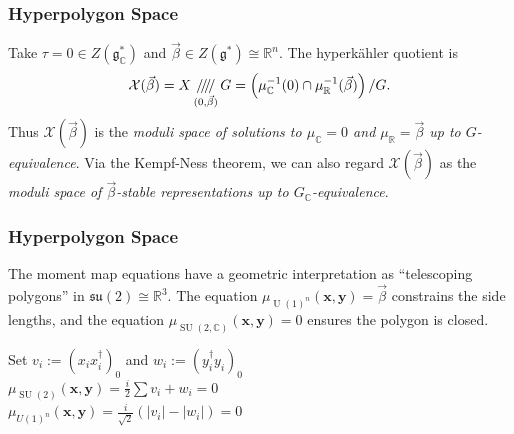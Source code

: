 \documentclass[aspectratio=1610,10pt]{beamer}
\theoremstyle{definition}
\theoremstyle{named}
\newcommand{\R}{\mathbb{R}}
\newcommand{\C}{\mathbb{C}}
\DeclareMathOperator{\U}{U}
\DeclareMathOperator{\SU}{SU}
\DeclareMathOperator{\Hom}{Hom}
\DeclareMathOperator{\Rep}{Rep}
\DeclareMathOperator*{\twoslash}{\hspace{-.2em}/\hspace{-.2em}/\hspace{-.2em}}
\DeclareMathOperator*{\fourslash}{\twoslash\twoslash}
\newcommand{\bx}{\mathbf{x}}
\newcommand{\by}{\mathbf{y}}
\begin{document}
\begin{frame}
    \frametitle{Hyperpolygon Space}
    Take $\tau=0\in Z(\mathfrak g_\C^*)$ and $\vec\beta\in Z(\mathfrak g^*)\cong\R^n$.  The hyperkähler quotient is
        $$\mathcal X(\vec\beta)=X\fourslash\limits_{(0,\vec\beta)}G=\left(\mu_\C^{-1}(0)\cap\mu_\R^{-1}(\vec\beta)\right)/G.$$
    Thus $\mathcal X(\vec\beta)$ is the \emph{moduli space of solutions to $\mu_\C=0$ and $\mu_\R=\vec\beta$ up to $G$-equivalence}.
    \vfill
    \pause
    Via the Kempf-Ness theorem, we can also regard $\mathcal X(\vec\beta)$ as the \emph{moduli space of $\vec\beta$-stable representations up to $G_\C$-equivalence}.
\end{frame}

\begin{frame}
    \frametitle{Hyperpolygon Space}
    The moment map equations have a geometric interpretation as ``telescoping polygons'' in $\mathfrak{su}(2)\cong\R^3$.  The equation $\mu_{\U(1)^n}(\bx,\by)=\vec\beta$ constrains the side lengths, and the equation $\mu_{\SU(2,\C)}(\bx,\by)=0$ ensures the polygon is closed.
    \vfill
    \begin{minipage}[t]{0.45\textwidth}
        \vspace{25pt}
        Set $v_i:=(x_ix_i^\dagger)_0$ and $w_i:=(y_i^\dagger y_i)_0$\\[1cm]
        $\mu_{\SU(2)}(\bx,\by)=\frac i2\sum v_i+w_i=0$\\[2pt]
        $\mu_{U(1)^n}(\bx,\by)=\frac i{\sqrt2}\left(|v_i|-|w_i|\right)=0$
        \vfill
    \end{minipage}
    \hfill
    \begin{minipage}[t]{0.45\textwidth}
        \vspace{-15pt}
        \begin{figure}
\end{figure}
\end{minipage}
\end{frame}
\end{document}

